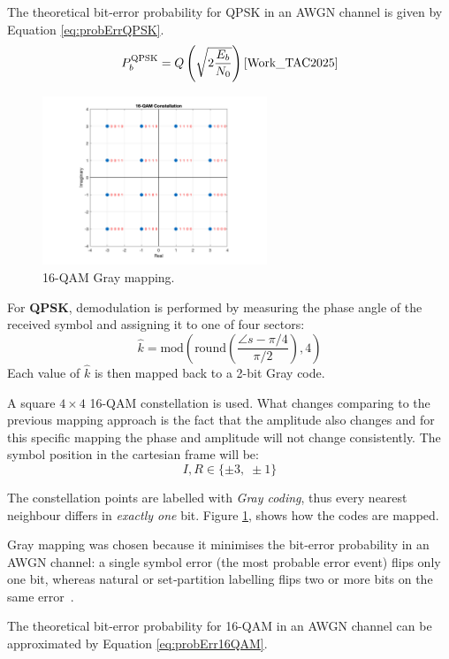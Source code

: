 The theoretical bit-error probability for QPSK in an AWGN channel is given by Equation \ref{eq:probErrQPSK}.
\begin{equation}
  P_b^{\text{QPSK}} = Q\left(\sqrt{2\frac{E_b}{N_0}}\right)\text{\cite{Work_TAC2025}}
  \label{eq:probErrQPSK}
\end{equation}

\begin{figure}[h]
	\centering
	\includegraphics[width=0.6\textwidth]{Images/16-QAM_Constellation.png}
	\caption{16-QAM Gray mapping.}
	\label{fig:QAM_Mapping}
\end{figure}


For \textbf{QPSK}, demodulation is performed by measuring the phase angle of the received symbol and assigning it to one of four sectors:
\[
\hat{k} = \text{mod}\left( \text{round}\left( \frac{\angle s - \pi/4}{\pi/2} \right), 4 \right)
\]
Each value of $\hat{k}$ is then mapped back to a 2-bit Gray code.


A square $4\times4$ 16-QAM constellation is used. What changes comparing to the previous mapping approach is the fact that the amplitude also changes and for this specific mapping the phase and amplitude will not change consistently. The symbol position in the cartesian frame will be:
\[
I,R \in \{\pm3,\;\pm1\}
\]

The constellation points are labelled with \emph{Gray coding}, thus every nearest neighbour differs in \emph{exactly one} bit. Figure \ref{fig:QAM_Mapping}, shows how the codes are mapped.

Gray mapping was chosen because it minimises the bit‑error probability in an AWGN channel: a single symbol error (the most probable error event) flips only one bit, whereas natural or set‑partition labelling flips two or more bits on the same error~\cite{Work_TAC2025}.  

The theoretical bit-error probability for 16-QAM in an AWGN channel can be approximated by Equation \ref{eq:probErr16QAM}.

